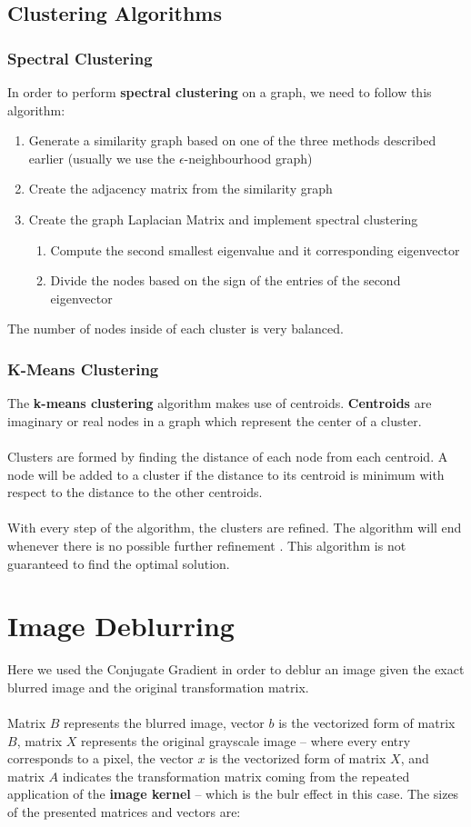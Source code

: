 \documentclass{article}
\begin{document}
\subsection{Clustering Algorithms}
\subsubsection{Spectral Clustering}
In order to perform \textbf{spectral clustering} on a graph, we need to follow this algorithm:

\begin{enumerate}
	\item Generate a similarity graph based on one of the three methods described earlier (usually we use the $\epsilon$-neighbourhood graph)
	\item Create the adjacency matrix from the similarity graph
	\item Create the graph Laplacian Matrix and implement spectral clustering
	\begin{enumerate}
		\item Compute the second smallest eigenvalue and it corresponding eigenvector
		\item Divide the nodes based on the sign of the entries of the second eigenvector
	\end{enumerate}
\end{enumerate}
The number of nodes inside of each cluster is very balanced.

\subsubsection{K-Means Clustering}
The \textbf{k-means clustering} algorithm makes use of centroids. \textbf{Centroids} are imaginary or real nodes in a graph which represent the center of a cluster. \\ \\
Clusters are formed by finding the distance of each node from each centroid. A node will be added to a cluster if the distance to its centroid is minimum with respect to the distance to the other centroids. \\ \\
With every step of the algorithm, the clusters are refined. The algorithm will end whenever there is no possible further refinement . This algorithm is not guaranteed to find the optimal solution.

\section{Image Deblurring}
Here we used the Conjugate Gradient in order to deblur an image given the exact blurred image and the original transformation matrix. \\ \\
Matrix $B$ represents the blurred image, vector $b$ is the vectorized form of matrix $B$, matrix $X$ represents the original grayscale image -- where every entry corresponds to a pixel, the vector $x$ is the vectorized form of matrix $X$, and matrix $A$ indicates the transformation matrix coming from the repeated application of the \textbf{image kernel} -- which is the bulr effect in this case. The sizes of the presented matrices and vectors are:
\end{document}
